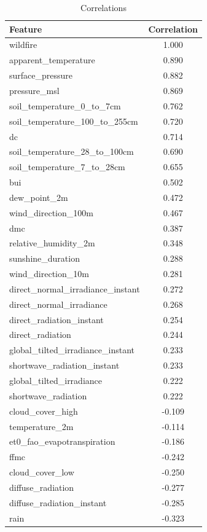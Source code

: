\begin{table}[H]
	\caption{Correlations}
	\centering
	\label{correlations}
	\begin{tabular}{lc}
		\hline
		Feature & Correlation \\ \hline
		wildfire & 1.000 \\
		apparent\_temperature & 0.890 \\
		surface\_pressure & 0.882 \\
		pressure\_msl & 0.869 \\
		soil\_temperature\_0\_to\_7cm & 0.762 \\
		soil\_temperature\_100\_to\_255cm & 0.720 \\
		dc & 0.714 \\
		soil\_temperature\_28\_to\_100cm & 0.690 \\
		soil\_temperature\_7\_to\_28cm & 0.655 \\
		bui & 0.502 \\
		dew\_point\_2m & 0.472 \\
		wind\_direction\_100m & 0.467 \\
		dmc & 0.387 \\
		relative\_humidity\_2m & 0.348 \\
		sunshine\_duration & 0.288 \\
		wind\_direction\_10m & 0.281 \\
		direct\_normal\_irradiance\_instant & 0.272 \\
		direct\_normal\_irradiance & 0.268 \\
		direct\_radiation\_instant & 0.254 \\
		direct\_radiation & 0.244 \\
		global\_tilted\_irradiance\_instant & 0.233 \\
		shortwave\_radiation\_instant & 0.233 \\
		global\_tilted\_irradiance & 0.222 \\
		shortwave\_radiation & 0.222 \\
		cloud\_cover\_high & -0.109 \\
		temperature\_2m & -0.114 \\
		et0\_fao\_evapotranspiration & -0.186 \\
		ffmc & -0.242 \\
		cloud\_cover\_low & -0.250 \\
		diffuse\_radiation & -0.277 \\
		diffuse\_radiation\_instant & -0.285 \\
		rain & -0.323 \\

\end{tabular}
\end{table}
